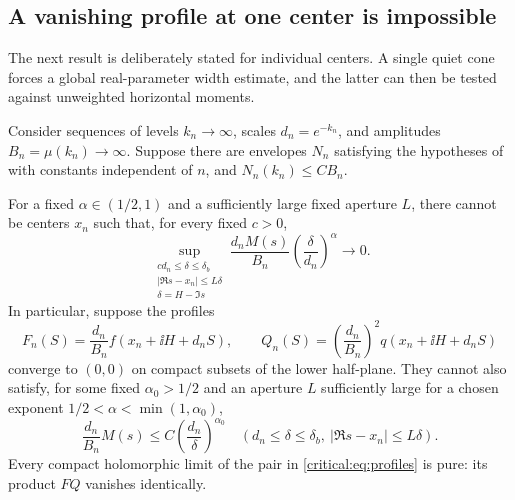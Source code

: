 \subsection{A vanishing profile at one center is impossible}

The next result is deliberately stated for individual centers. A
single quiet cone forces a global real-parameter width estimate, and
the latter can then be tested against unweighted horizontal moments.

\begin{theorem}\label{thm:no-trivial-profile}
Consider sequences of levels \(k_n\to\infty\), scales
\(d_n=e^{-k_n}\), and amplitudes \(B_n=\mu(k_n)\to\infty\).
Suppose there are envelopes \(N_n\) satisfying the hypotheses of
 with constants independent of \(n\),
and \(N_n(k_n)\le C B_n\).

For a fixed \(\alpha\in(1/2,1)\) and a sufficiently large fixed
aperture \(L\), there cannot be centers \(x_n\) such that, for every
fixed \(c>0\),
\begin{equation}\label{critical:eq:quiet-cone}
 \sup_{\substack{c d_n\le\delta\le\delta_b\\
                  |\Re s-x_n|\le L\delta\\
                  \delta=H-\Im s}}
 \frac{d_nM(s)}{B_n}\left(\frac{\delta}{d_n}\right)^\alpha
 \longrightarrow0.
\end{equation}
In particular, suppose the profiles
\begin{equation}\label{critical:eq:profiles}
 F_n(S)=\frac{d_n}{B_n}f(x_n+\ii H+d_nS),\qquad
 Q_n(S)=\left(\frac{d_n}{B_n}\right)^2q(x_n+\ii H+d_nS)
\end{equation}
converge to \((0,0)\) on compact subsets of the lower half-plane.
They cannot also satisfy, for some fixed \(\alpha_0>1/2\) and an
aperture \(L\) sufficiently large for a chosen exponent
\(1/2<\alpha<\min(1,\alpha_0)\),
\begin{equation}\label{critical:eq:bounded-coarse-cone}
 \frac{d_n}{B_n}M(s)\le C\left(\frac{d_n}{\delta}\right)^{\alpha_0}
 \quad(d_n\le\delta\le\delta_b,
             \ |\Re s-x_n|\le L\delta).
\end{equation}
Every compact holomorphic limit of the pair in
\eqref{critical:eq:profiles} is pure: its product \(FQ\) vanishes
identically.
\end{theorem}

